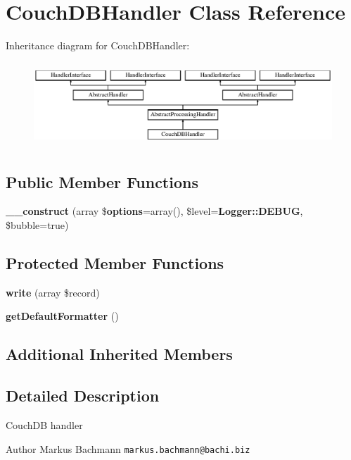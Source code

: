 \section{Couch\+D\+B\+Handler Class Reference}
\label{class_monolog_1_1_handler_1_1_couch_d_b_handler}
Inheritance diagram for Couch\+D\+B\+Handler\+:\begin{figure}[H]
\begin{center}
\leavevmode
\includegraphics[height=3.200000cm]{class_monolog_1_1_handler_1_1_couch_d_b_handler}
\end{center}
\end{figure}
\subsection*{Public Member Functions}
\begin{DoxyCompactItemize}
\item 
{\bf \+\_\+\+\_\+construct} (array \${\bf options}=array(), \$level={\bf Logger\+::\+D\+E\+B\+U\+G}, \$bubble=true)
\end{DoxyCompactItemize}
\subsection*{Protected Member Functions}
\begin{DoxyCompactItemize}
\item 
{\bf write} (array \$record)
\item 
{\bf get\+Default\+Formatter} ()
\end{DoxyCompactItemize}
\subsection*{Additional Inherited Members}


\subsection{Detailed Description}
Couch\+D\+B handler

\begin{DoxyAuthor}{Author}
Markus Bachmann {\tt markus.\+bachmann@bachi.\+biz} 
\end{DoxyAuthor}


